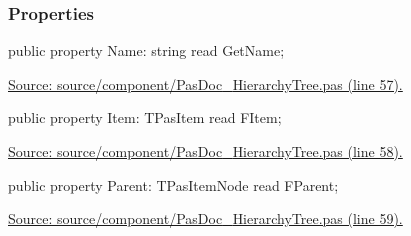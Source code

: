 \documentclass{report}
\newif\ifpdf
\begin{document}
\subsubsection*{\large{\textbf{Properties}}\normalsize\hspace{1ex}\hfill}
\begin{list}{}{
\setlength{\itemindent}{0cm}
\setlength{\listparindent}{0cm}
\setlength{\leftmargin}{\evensidemargin}
\addtolength{\leftmargin}{\tmplength}
\settowidth{\labelsep}{X}
\addtolength{\leftmargin}{\labelsep}
\setlength{\labelwidth}{\tmplength}
}
\label{PasDoc_HierarchyTree.TPasItemNode-Name}
\item[\textbf{Name}\hfill]
\ifpdf
\begin{flushleft}
\fi
\begin{ttfamily}
public property Name: string read GetName;\end{ttfamily}

\ifpdf
\end{flushleft}
\fi


\par  \par
\href{https://github.com/pasdoc/pasdoc/blob/master/source/component/PasDoc_HierarchyTree.pas#L57}{Source: source/component/PasDoc{\_}HierarchyTree.pas (line 57).}\label{PasDoc_HierarchyTree.TPasItemNode-Item}
\item[\textbf{Item}\hfill]
\ifpdf
\begin{flushleft}
\fi
\begin{ttfamily}
public property Item: TPasItem read FItem;\end{ttfamily}

\ifpdf
\end{flushleft}
\fi


\par  \par
\href{https://github.com/pasdoc/pasdoc/blob/master/source/component/PasDoc_HierarchyTree.pas#L58}{Source: source/component/PasDoc{\_}HierarchyTree.pas (line 58).}\label{PasDoc_HierarchyTree.TPasItemNode-Parent}
\item[\textbf{Parent}\hfill]
\ifpdf
\begin{flushleft}
\fi
\begin{ttfamily}
public property Parent: TPasItemNode read FParent;\end{ttfamily}

\ifpdf
\end{flushleft}
\fi


\par  \par
\href{https://github.com/pasdoc/pasdoc/blob/master/source/component/PasDoc_HierarchyTree.pas#L59}{Source: source/component/PasDoc{\_}HierarchyTree.pas (line 59).}\end{list}
\end{document}
